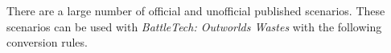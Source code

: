 There are a large number of official and unofficial published scenarios.
These scenarios can be used with \emph{BattleTech: Outworlds Wastes} with the following conversion rules.
